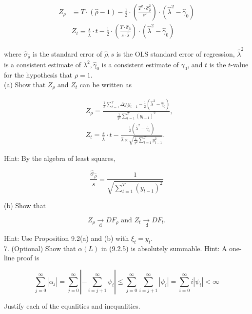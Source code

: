 \documentclass[10pt]{article}
\begin{document}
$$
\begin{aligned}
Z_{\rho} & \equiv T \cdot(\hat{\rho}-1)-\frac{1}{2} \cdot\left(\frac{T^{2} \cdot \hat{\sigma}_{\hat{\rho}}^{2}}{s^{2}}\right) \cdot\left(\hat{\lambda}^{2}-\hat{\gamma}_{0}\right) \\
& Z_{t} \equiv \frac{s}{\hat{\lambda}} \cdot t-\frac{1}{2} \cdot\left(\frac{T \cdot \hat{\sigma}_{\hat{\rho}}}{s \cdot \hat{\lambda}}\right) \cdot\left(\hat{\lambda}^{2}-\hat{\gamma}_{0}\right)
\end{aligned}
$$

where $\hat{\sigma}_{\hat{\rho}}$ is the standard error of $\hat{\rho}, s$ is the OLS standard error of regression, $\hat{\lambda}^{2}$ is a consistent estimate of $\lambda^{2}, \hat{\gamma}_{0}$ is a consistent estimate of $\gamma_{0}$, and $t$ is the $t$-value for the hypothesis that $\rho=1$.\\
(a) Show that $Z_{\rho}$ and $Z_{t}$ can be written as

$$
\begin{aligned}
& Z_{\rho}=\frac{\frac{1}{T} \sum_{t=1}^{T} \Delta y_{t} y_{t-1}-\frac{1}{2}\left(\hat{\lambda}^{2}-\hat{\gamma}_{0}\right)}{\frac{1}{T^{2}} \sum_{t=1}^{T}\left(y_{t-1}\right)^{2}}, \\
& Z_{t}=\frac{s}{\hat{\lambda}} \cdot t-\frac{\frac{1}{2}\left(\hat{\lambda}^{2}-\hat{\gamma}_{0}\right)}{\hat{\lambda} \times \sqrt{\frac{1}{T^{2}} \sum_{t=1}^{T} y_{t-1}^{2}}} .
\end{aligned}
$$

Hint: By the algebra of least squares,

$$
\frac{\hat{\sigma}_{\hat{\rho}}}{s}=\frac{1}{\sqrt{\sum_{t=1}^{T}\left(y_{t-1}\right)^{2}}}
$$

(b) Show that

$$
Z_{\rho} \underset{\mathrm{d}}{\rightarrow} D F_{\rho} \text { and } Z_{t} \underset{\mathrm{~d}}{\rightarrow} D F_{t} .
$$

Hint: Use Proposition 9.2(a) and (b) with $\xi_{t}=y_{t}$.\\
7. (Optional) Show that $\alpha(L)$ in (9.2.5) is absolutely summable. Hint: A one-line proof is

$$
\sum_{j=0}^{\infty}\left|\alpha_{j}\right|=\sum_{j=0}^{\infty}\left|-\sum_{i=j+1}^{\infty} \psi_{i}\right| \leq \sum_{j=0}^{\infty} \sum_{i=j+1}^{\infty}\left|\psi_{i}\right|=\sum_{i=0}^{\infty} i\left|\psi_{i}\right|<\infty
$$

Justify each of the equalities and inequalities.
\end{document}
